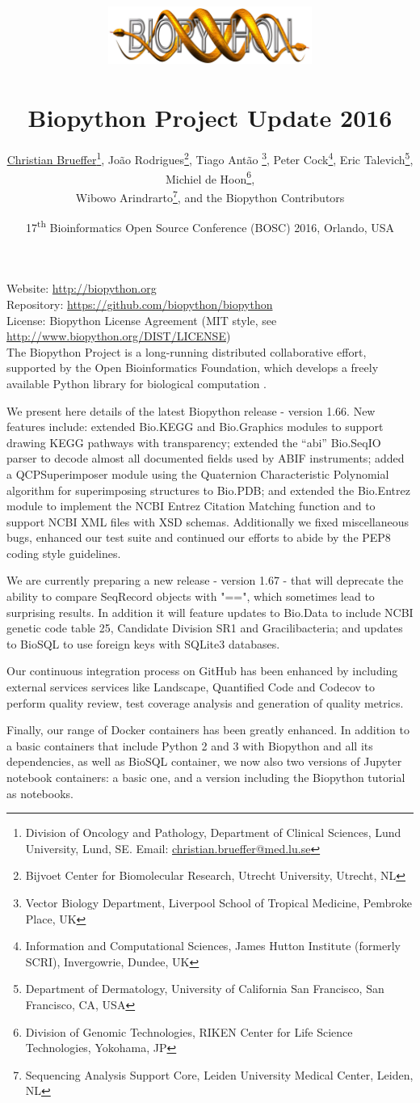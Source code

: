 \documentclass[10pt,oneside]{article}
\title{%
\vspace{-1.5in}
\includegraphics[width=0.5\textwidth]{biopython.jpg}\\
~\\Biopython Project Update 2016}
\author{
	\underline{Christian Brueffer}\footnote{Division of Oncology and Pathology, Department of Clinical Sciences, Lund University, Lund, SE. Email: \href{mailto:christian.brueffer@med.lu.se}{christian.brueffer@med.lu.se}},
    Jo\~{a}o Rodrigues\footnote{Bijvoet Center for Biomolecular Research, Utrecht University, Utrecht, NL},
    Tiago Ant\~{a}o \footnote{Vector Biology Department, Liverpool School of Tropical Medicine, Pembroke Place, UK},
    Peter Cock\footnote{Information and Computational Sciences, James Hutton Institute (formerly SCRI), Invergowrie, Dundee, UK},
    Eric Talevich\footnote{Department of Dermatology, University of California San Francisco, San Francisco, CA, USA},
    Michiel de Hoon\footnote{Division of Genomic Technologies, RIKEN Center for Life Science Technologies, Yokohama, JP},
		\\
    Wibowo Arindrarto\footnote{Sequencing Analysis Support Core, Leiden University Medical Center, Leiden, NL},
    and the Biopython Contributors}
\date{17\textsuperscript{th} Bioinformatics Open Source Conference (BOSC) 2016, Orlando, USA}
\begin{document}
\maketitle
\thispagestyle{empty}

\vspace{-0.2in}
\noindent
Website: \url{http://biopython.org} \\
Repository: \url{https://github.com/biopython/biopython} \\
License: Biopython License Agreement (MIT style, see \url{http://www.biopython.org/DIST/LICENSE}) \\

The Biopython Project is a long-running distributed collaborative effort, supported by the Open Bioinformatics Foundation, which develops a freely available Python library for biological computation \cite{AppNote}.

We present here details of the latest Biopython release - version 1.66. New features include: extended Bio.KEGG and Bio.Graphics modules to support drawing KEGG pathways with transparency; extended the ``abi'' Bio.SeqIO parser to decode almost all documented fields used by ABIF instruments; added a QCPSuperimposer module using the Quaternion Characteristic Polynomial algorithm for superimposing structures to Bio.PDB; and extended the Bio.Entrez module to implement the NCBI Entrez Citation Matching function and to support NCBI XML files with XSD schemas.  Additionally we fixed miscellaneous bugs, enhanced our test suite and continued our efforts to abide by the PEP8 coding style guidelines.

We are currently preparing a new release - version 1.67 - that will deprecate the ability to compare SeqRecord objects with "==", which sometimes lead to surprising results.  In addition it will feature updates to Bio.Data to include NCBI genetic code table 25, Candidate Division SR1 and Gracilibacteria; and updates to BioSQL to use foreign keys with SQLite3 databases.

Our continuous integration process on GitHub has been enhanced by including external services services like Landscape, Quantified Code and Codecov to perform quality review, test coverage analysis and generation of quality metrics.

Finally, our range of Docker containers has been greatly enhanced. In addition to a basic containers that include Python 2 and 3 with Biopython and all its dependencies, as well as BioSQL container, we now also two versions of Jupyter notebook containers: a basic one, and a version including the Biopython tutorial as notebooks.
\end{document}

